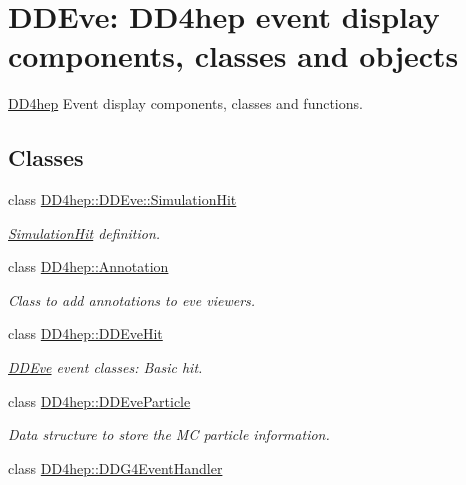 \hypertarget{group___d_d4_h_e_p___e_v_e}{
\section{DDEve: DD4hep event display components, classes and objects}
\label{group___d_d4_h_e_p___e_v_e}
}


\hyperlink{namespace_d_d4hep}{DD4hep} Event display components, classes and functions.  
\subsection*{Classes}
\begin{DoxyCompactItemize}
\item 
class \hyperlink{class_d_d4hep_1_1_d_d_eve_1_1_simulation_hit}{DD4hep::DDEve::SimulationHit}
\begin{DoxyCompactList}\small\item\em \hyperlink{class_d_d4hep_1_1_d_d_eve_1_1_simulation_hit}{SimulationHit} definition. \item\end{DoxyCompactList}\item 
class \hyperlink{class_d_d4hep_1_1_annotation}{DD4hep::Annotation}
\begin{DoxyCompactList}\small\item\em Class to add annotations to eve viewers. \item\end{DoxyCompactList}\item 
class \hyperlink{class_d_d4hep_1_1_d_d_eve_hit}{DD4hep::DDEveHit}
\begin{DoxyCompactList}\small\item\em \hyperlink{struct_d_d4hep_1_1_d_d_eve}{DDEve} event classes: Basic hit. \item\end{DoxyCompactList}\item 
class \hyperlink{class_d_d4hep_1_1_d_d_eve_particle}{DD4hep::DDEveParticle}
\begin{DoxyCompactList}\small\item\em Data structure to store the MC particle information. \item\end{DoxyCompactList}\item 
class \hyperlink{class_d_d4hep_1_1_d_d_g4_event_handler}{DD4hep::DDG4EventHandler}
\item 

\end{DoxyCompactItemize}
